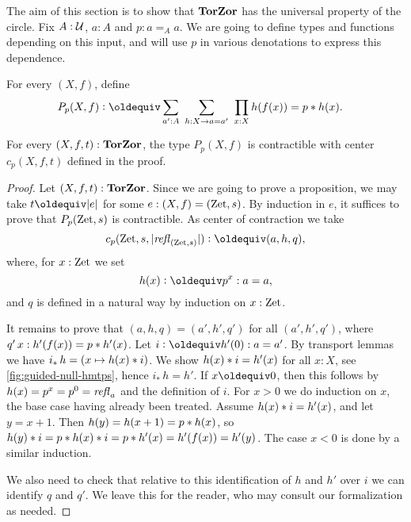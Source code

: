 \documentclass[a4,12pt]{amsart}
\begin{document}
The aim of this section is to show that $\mathbf{TorZor}$ has the
universal property of the circle. Fix $A:\mathcal{U}$, $a:A$ and $p: a=_A a$. 
We are going to define types and
functions depending on this input, and will use $p$ in various
denotations to express this dependence. 

\begin{definition}\label{def:TBN}
For every $(X,f)$, define
\begin{align*}\label{eq:TBD}
P_p(X,f)&\defeq \sum_{a':A}~\sum_{h:X\to a=a'}~\prod_{x:X} h(f(x))=p\ct h(x).
\end{align*}
\end{definition}

\begin{lemma}\label{lem:guided-null-hmtps}
For every $(X,f,t):\mathbf{TorZor}$, the type $P_p(X,f)$ is contractible
with center $c_p(X,f,t)$ defined in the proof.
\end{lemma}
\begin{proof}
  Let $(X,f,t):\mathbf{TorZor}$. Since we are going to prove a proposition,
  we may take $t\jdeq\trunc e$ for some $e : (X,f)=(\mathrm{Zet},s)$.
  By induction in $e$, it suffices to prove that $P_p(\mathrm{Zet},s)$ is contractible.
  As center of contraction we take
  \[
    c_p(\zet,s,\trunc{\refl{(\zet,s)}})\defeq (a, h, q),
  \]
  where, for $x : \mathrm{Zet}$ we set
  \[
    h(x) \defeq p^x : a = a,
  \]
  and $q$ is defined in a natural way by induction on $x : \mathrm{Zet}$.

  It remains to prove that $(a,h,q)=(a',h',q')$ for all $(a',h',q')$,
  where $q'\,x : h'(f(x))=p* h'(x)$.
  Let $i\defeq h'(0): a=a'$.
  By transport lemmas we have $i_*\, h = (x\mapsto h(x)* i)$.
  We show $h(x) * i = h'(x)$ for all $x:X$, see \cref{fig:guided-null-hmtps},
  hence $i_*\, h = h'$.
  If $x \jdeq 0$, then this follows by $h(x)=p^x=p^0=\mathop{{\it refl}_{a}}$
  and the definition of $i$.
  For $x > 0$ we do induction on $x$,
  the base case having already been treated.
  Assume $h(x)* i = h'(x)$, and let $y = x+1$.
  Then $h(y) = h(x+1) = p * h(x)$,
  so $h(y)* i = p * h(x) * i = p* h'(x) = h'(f(x)) = h'(y)$.
  The case $x < 0$ is done by a similar induction.

  We also need to check that relative to this identification of $h$ and $h'$ over $i$
  we can identify $q$ and $q'$.
  We leave this for the reader, who may consult our formalization as needed.
\end{proof}
\end{document}
